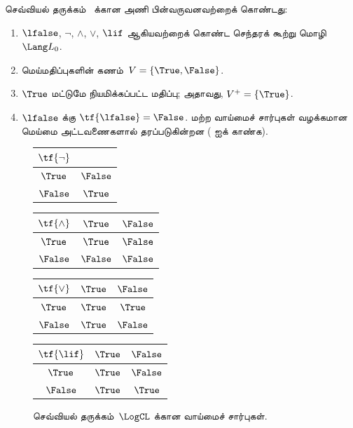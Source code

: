 \documentclass[../../../include/open-logic-section]{subfiles}
\begin{document}
\begin{ex}
செவ்வியல் தருக்கம்~\LogCL{} க்கான அணி பின்வருவனவற்றைக் கொண்டது:
\begin{enumerate}
  \item $\lfalse$, $\lnot$, $\land$, $\lor$, $\lif$ ஆகியவற்றைக் கொண்ட
  செந்தரக் கூற்று மொழி~$\Lang L_0$.
  \item மெய்மதிப்புகளின் கணம்~$V = \{\True, \False\}$.
  \item $\True$ மட்டுமே நியமிக்கப்பட்ட மதிப்பு; அதாவது,
  $V^+ = \{\True\}$.
  \item $\lfalse$ க்கு $\tf{\lfalse} = \False$. மற்ற வாய்மைச் சார்புகள்
  வழக்கமான மெய்மை அட்டவணைகளால் தரப்படுகின்றன
  ( ஐக் காண்க).
\end{enumerate}
\begin{figure}
  \begin{center}
      \begin{tabular}{c|c}
        $\tf{\lnot}$ & \\
        \hline
        $\True$ & $\False$ \\
        $\False$ & $\True$
      \end{tabular}
      \quad
      \begin{tabular}{c|cc}
        $\tf{\land}$ & $\True$ & $\False$ \\
        \hline
        $\True$ & $\True$ & $\False$ \\
        $\False$ & $\False$ & $\False$
      \end{tabular}
      \quad
      \begin{tabular}{c|cc}
        $\tf{\lor}$ & $\True$ & $\False$ \\
        \hline
        $\True$ & $\True$ & $\True$ \\
        $\False$ & $\True$ & $\False$
      \end{tabular}
      \quad
      \begin{tabular}{c|cc}
        $\tf{\lif}$ & $\True$ & $\False$ \\
        \hline
        $\True$ & $\True$ & $\False$ \\
        $\False$ & $\True$ & $\True$
      \end{tabular}
    \end{center}
    \caption{செவ்வியல் தருக்கம்~$\LogCL$ க்கான வாய்மைச் சார்புகள்.}
  \end{figure}
  \end{ex}
\end{document}
